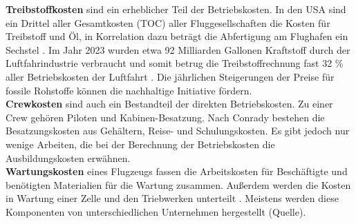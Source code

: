 %
\textbf{Treibstoffkosten} sind ein erheblicher Teil der Betriebskosten. 
In den USA sind ein Drittel aller Gesamtkosten (TOC) aller Fluggesellschaften 
die Kosten für Treibstoff und Öl, in Korrelation dazu beträgt 
die Abfertigung am Flughafen ein Sechstel \cite{conrady2019luftverkehr}. 
Im Jahr 2023 wurden etwa 92 Milliarden Gallonen Kraftstoff durch der 
Luftfahrindustrie verbraucht und somit betrug die Treibstoffrechnung fast 32 \% 
aller Betriebskosten der Luftfahrt \cite{iata_industry_statistics_2024}.
Die jährlichen Steigerungen der Preise für fossile Rohstoffe können die nachhaltige Initiative fördern. \\
%
%
%
\textbf{Crewkosten} sind auch ein Bestandteil der direkten Betriebskosten. 
Zu einer Crew gehören Piloten und Kabinen-Besatzung.
Nach Conrady \cite{conrady2019luftverkehr} bestehen die Besatzungskosten aus 
Gehältern, Reise- und Schulungskosten. Es gibt jedoch nur wenige Arbeiten, 
die bei der Berechnung der Betriebskosten die Ausbildungskosten erwähnen. \\
%
\textbf{Wartungskosten} eines Flugzeugs fassen die Arbeitskosten für Beschäftigte
und benötigten Materialien für die Wartung zusammen.
Außerdem werden die Kosten in Wartung einer Zelle und den Triebwerken unterteilt \cite{wang2021research}. 
Meistens werden diese Komponenten von unterschiedlichen Unternehmen hergestellt (Quelle).
